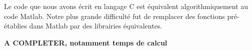 \documentclass[conference]{IEEEtran}
\begin{document}
Le code que nous avons écrit en langage C est équivalent algorithmiquement au code Matlab. Notre plus grande difficulté fut de remplacer des fonctions pré-établies dans Matlab par des librairies équivalentes.

\textbf{A COMPLETER, notamment temps de calcul}


%
%



%
%
\end{document}
